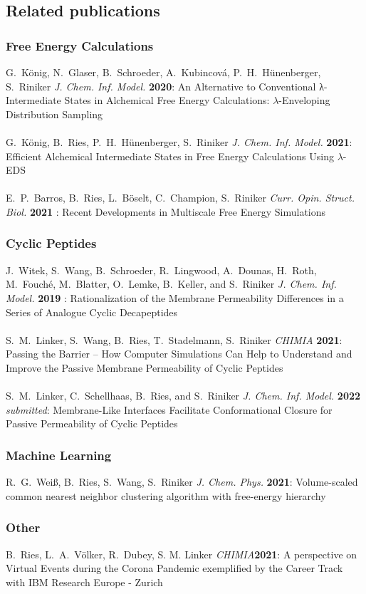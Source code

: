 \subsection*{Related publications}
\subsubsection*{Free Energy Calculations}

G.\ K\"onig, N.\ Glaser, B.\ Schroeder, A.\ Kubincová, P.\ H.\ H\"unenberger, S.\ Riniker {\em J. Chem. Inf. Model.} {\bf 2020}:
An Alternative to Conventional λ-Intermediate States in Alchemical Free Energy Calculations: $\lambda$-Enveloping Distribution Sampling
\\\\
G.\ K\"onig, B.\ Ries, P.\ H.\ H\"unenberger, S.\ Riniker {\em J. Chem. Inf. Model.} {\bf 2021}:
Efficient Alchemical Intermediate States in Free Energy Calculations Using  $\lambda$-EDS
\\\\
E.\ P.\ Barros, B.\ Ries, L.\ B\"oselt, C.\ Champion, S.\ Riniker {\em Curr. Opin. Struct. Biol.} {\bf 2021} :
Recent Developments in Multiscale Free Energy Simulations


\subsubsection*{Cyclic Peptides}

J.\ Witek, S.\ Wang, B.\ Schroeder, R.\ Lingwood, A.\ Dounas, H.\ Roth, M.\ Fouché, M.\ Blatter, O.\ Lemke, B.\ Keller, and S.\ Riniker {\em J. Chem. Inf. Model.} {\bf 2019} :
Rationalization of the Membrane Permeability Differences in a Series of Analogue Cyclic Decapeptides
\\\\
S.\ M.\ Linker, S.\ Wang, B.\ Ries, T.\ Stadelmann, S.\ Riniker {\em CHIMIA} {\bf 2021}: 
Passing the Barrier – How Computer Simulations Can Help to Understand and Improve the Passive Membrane Permeability of Cyclic Peptides
\\\\
S.\ M.\ Linker, C.\ Schellhaas, B.\ Ries, and S.\ Riniker {\em J. Chem. Inf. Model.} {\bf 2022} {\em submitted}:
Membrane-Like Interfaces Facilitate Conformational Closure for Passive Permeability of Cyclic Peptides

\subsubsection*{Machine Learning}

R.\ G.\ Wei\ss, B.\ Ries, S.\ Wang, S.\ Riniker {\em J. Chem. Phys.} {\bf 2021}:
Volume-scaled common nearest neighbor clustering algorithm with free-energy hierarchy 


\subsubsection*{Other}

B.\ Ries, L.\ A.\ V\"olker, R.\ Dubey, S. M. Linker {\em CHIMIA}{\bf 2021}: A perspective on Virtual Events during the Corona Pandemic exemplified by the Career Track with IBM Research Europe - Zurich